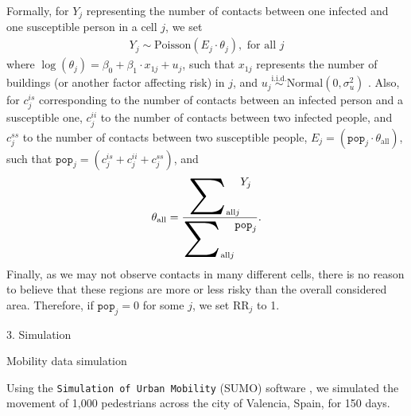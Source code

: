 \documentclass[12pt]{beamer}
\begin{document}
\begin{frame}[t]
\begin{columns}[t]
\begin{column}{0.30\textwidth}
			Formally, for $Y_j$ representing the number of contacts between one infected and one susceptible person in a cell $j$, we set 
			\begin{align*}\label{eq:model-RR}
				Y_j \sim \text{Poisson}(E_j\cdot\theta_j), \text{~for all~} j
			\end{align*}
			where $\log(\theta_j) = \beta_0 + \beta_1 \cdot x_{1j} + u_j$, such that $x_{1j}$ represents the number of buildings (or another factor affecting risk) in $j$, and $u_j \overset{\text{i.i.d.}}{\sim} \text{Normal}(0, \sigma^2_{u})$ \cite{moraga2019geospatial}. Also, for $c^{is}_{j}$ corresponding to the number of contacts between an infected person and a susceptible one, $c^{ii}_{j}$ to the number of contacts between two infected people, and $c^{ss}_{j}$ to the number of contacts between two susceptible people, 	$E_j = (\texttt{pop}_j \cdot \theta_{\text{all}})$, such that $\texttt{pop}_j = (c^{is}_{j} + c^{ii}_{j} + c^{ss}_{j})$, and 
			\begin{align*} %
				\theta_{\text{all}} = \frac{\displaystyle\raisebox{-18pt}{\scalebox{3.2}{\ensuremath{\sum}}}_{\text{all} j}Y_j}{\displaystyle\raisebox{-18pt}{\scalebox{3.2}{\ensuremath{\sum}}}_{\text{all} j}\texttt{pop}_j}.
			\end{align*}
			Finally, as we may not observe contacts in many different cells, there is no reason to believe that these regions are more or less risky than the overall considered area. Therefore, if $\texttt{pop}_j = 0$ for some $j$, we set $\text{RR}_j$ to 1.\vspace{12pt}
		
			\begin{block}{\Large 3. Simulation}\justifying \vspace{12pt}
				
				{\large \textcolor{title-fg}{Mobility data simulation}} \vspace{12pt}
				
				Using the \texttt{Simulation of Urban Mobility} (SUMO) software \citep{SUMO2018}, we simulated  the movement of 1,000 pedestrians across the city of Valencia, Spain, for 150 days.\vspace{12pt}
				
				\begin{figure}[!ht]
					\centering
					
					\vspace{-18pt}
					

\end{figure}
\end{block}
\end{column}
\end{columns}
\end{frame}
\end{document}
